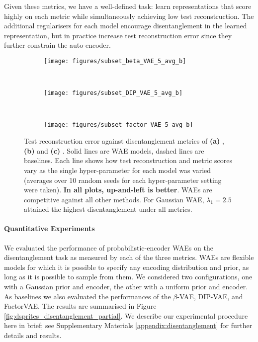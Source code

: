 Given these metrics, we have a well-defined task: learn representations that score highly on each metric while simultaneously achieving low test reconstruction. 
The additional regularisers for each model encourage disentanglement in the learned representation, but in practice increase test reconstruction error since they further constrain the auto-encoder.
%
\begin{figure}[t]
	\centering
	\begin{subfigure}[t]{0.33\textwidth}
		\centering
		\texttt{[image: figures/subset\_beta\_VAE\_5\_avg\_b]}
		\caption{}
	\end{subfigure}%
	~ 
	\begin{subfigure}[t]{0.33\textwidth}
		\centering
		\texttt{[image: figures/subset\_DIP\_VAE\_5\_avg\_b]}
		\caption{}
	\end{subfigure}%
	~ 
	\begin{subfigure}[t]{0.33\textwidth}
	\centering
	\texttt{[image: figures/subset\_factor\_VAE\_5\_avg\_b]}
	\caption{}
	\end{subfigure}
	\caption{\label{fig:dsprites_disentanglement_partial}Test reconstruction error against disentanglement metrics of {\bf (a)} \cite{HM+17}, {\bf (b)} \cite{kumar2017variational} and {\bf (c)} \cite{kim2018disentangling}. Solid lines are WAE models, dashed lines are baselines. Each line shows how test reconstruction and metric scores vary as the single hyper-parameter for each model was varied (averages over 10 random seeds for each hyper-parameter setting were taken). \textbf{In all plots, up-and-left is better}. WAEs are competitive against all other methods. For Gaussian WAE, $\lambda_1=2.5$ attained the highest disentanglement under all metrics. \label{fig:latent_traversals}}
\end{figure}
%
\paragraph{Quantitative Experiments} We evaluated the performance of probabilistic-encoder WAEs on the disentanglement task as measured by each of the three metrics. 
WAEs are flexible models for which it is possible to specify any encoding distribution and prior, as long as it is possible to sample from them. We considered two configurations, one with a Gaussian prior and encoder, the other with a uniform prior and encoder.
As baselines we also evaluated the performances of the $\beta$-VAE, DIP-VAE, and FactorVAE. The results are summarised in Figure \ref{fig:dsprites_disentanglement_partial}. We describe our experimental procedure here in brief; see Supplementary Materials \ref{appendix:disentanglement} for further details and results.

